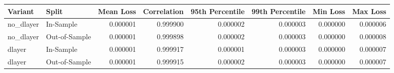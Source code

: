 \begin{tabular}{llrrrrrr}
\toprule
Variant & Split & Mean Loss & Correlation & 95th Percentile & 99th Percentile & Min Loss & Max Loss \\
\midrule
no_dlayer & In-Sample & 0.000001 & 0.999900 & 0.000002 & 0.000003 & 0.000000 & 0.000006 \\
no_dlayer & Out-of-Sample & 0.000001 & 0.999898 & 0.000002 & 0.000003 & 0.000000 & 0.000008 \\
dlayer & In-Sample & 0.000001 & 0.999917 & 0.000001 & 0.000003 & 0.000000 & 0.000007 \\
dlayer & Out-of-Sample & 0.000001 & 0.999915 & 0.000002 & 0.000003 & 0.000000 & 0.000007 \\
\bottomrule
\end{tabular}
